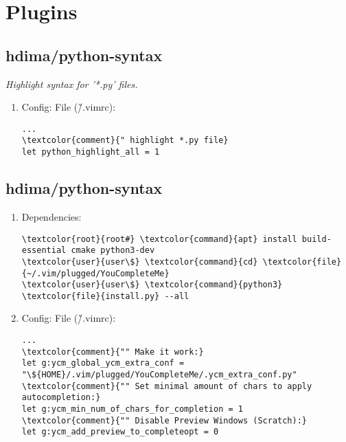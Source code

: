 \documentclass[10pt, a4paper, onecolumn, openany]{book} %
\begin{document}
\section{Plugins}
\subsection{hdima/python-syntax}
\textit{Highlight syntax for '*.py' files.}
\begin{enumerate}
    \item Config:
\newline File (\textcolor{file}{\~/.vimrc}):
\begin{Verbatim}[commandchars=\\\{\}]
...
\textcolor{comment}{" highlight *.py file}
let python_highlight_all = 1 
\end{Verbatim}
\end{enumerate}
\subsection{hdima/python-syntax}
\begin{enumerate}
    \item Dependencies:
\begin{Verbatim}[commandchars=\\\{\}]
\textcolor{root}{root#} \textcolor{command}{apt} install build-essential cmake python3-dev
\textcolor{user}{user\$} \textcolor{command}{cd} \textcolor{file}{~/.vim/plugged/YouCompleteMe}
\textcolor{user}{user\$} \textcolor{command}{python3} \textcolor{file}{install.py} --all
\end{Verbatim}
    \item Config:
\newline File (\textcolor{file}{\~/.vimrc}):
\begin{Verbatim}[commandchars=\\\{\}]
...
\textcolor{comment}{"" Make it work:}
let g:ycm_global_ycm_extra_conf = "\${HOME}/.vim/plugged/YouCompleteMe/.ycm_extra_conf.py"
\textcolor{comment}{"" Set minimal amount of chars to apply autocompletion:}
let g:ycm_min_num_of_chars_for_completion = 1
\textcolor{comment}{"" Disable Preview Windows (Scratch):}
let g:ycm_add_preview_to_completeopt = 0
\end{Verbatim}
\end{enumerate}
\end{document}
